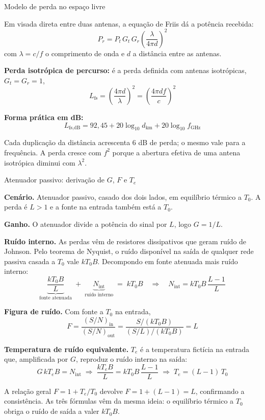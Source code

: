 \begin{frame}[allowframebreaks]{Modelo de perda no espaço livre}

Em visada direta entre duas antenas, a equação de Friis dá a potência recebida:
\[
P_r = P_t \, G_t \, G_r \left( \frac{\lambda}{4 \pi d} \right)^2
\]
com $\lambda = c/f$ o comprimento de onda e $d$ a distância entre as antenas.

\vspace{0.2cm}

\textbf{Perda isotrópica de percurso:} é a perda definida com antenas isotrópicas, $G_t = G_r = 1$,
\[
L_{\text{fs}} = \left( \frac{4 \pi d}{\lambda} \right)^2 = \left( \frac{4 \pi d f}{c} \right)^2
\]

\textbf{Forma prática em dB:}
\[
L_{\text{fs,dB}} = 92{,}45 + 20\log_{10} d_{\text{km}} + 20\log_{10} f_{\text{GHz}}
\]

\vspace{0.2cm}

Cada duplicação da distância acrescenta $6$ dB de perda; o mesmo vale para a frequência. A perda cresce com $f^2$ porque a abertura efetiva de uma antena isotrópica diminui com $\lambda^2$.

\end{frame}


\begin{frame}[allowframebreaks]{Atenuador passivo: derivação de $G$, $F$ e $T_e$}

\textbf{Cenário.} Atenuador passivo, casado dos dois lados, em equilíbrio térmico a $T_0$. A perda é $L > 1$ e a fonte na entrada também está a $T_0$.

\textbf{Ganho.} O atenuador divide a potência do sinal por $L$, logo $G = 1/L$.

\textbf{Ruído interno.} As perdas vêm de resistores dissipativos que geram ruído de Johnson. Pelo teorema de Nyquist, o ruído disponível na saída de qualquer rede passiva casada a $T_0$ vale $kT_0 B$. Decompondo em fonte atenuada mais ruído interno:
\[
\underbrace{\frac{kT_0 B}{L}}_{\text{fonte atenuada}} \;+\; \underbrace{N_{\text{int}}}_{\text{ruído interno}} \;=\; kT_0 B
\quad\Longrightarrow\quad
N_{\text{int}} = kT_0 B \, \frac{L-1}{L}
\]

\textbf{Figura de ruído.} Com fonte a $T_0$ na entrada,
\[
F = \frac{(S/N)_{\text{in}}}{(S/N)_{\text{out}}} = \frac{S/(kT_0 B)}{(S/L)/(kT_0 B)} = L
\]

\textbf{Temperatura de ruído equivalente.} $T_e$ é a temperatura fictícia na entrada que, amplificada por $G$, reproduz o ruído interno na saída:
\[
G \, k T_e B = N_{\text{int}}
\;\Longrightarrow\;
\frac{k T_e B}{L} = kT_0 B \, \frac{L-1}{L}
\;\Longrightarrow\;
T_e = (L-1)\, T_0
\]

A relação geral $F = 1 + T_e/T_0$ devolve $F = 1 + (L-1) = L$, confirmando a consistência. As três fórmulas vêm da mesma ideia: o equilíbrio térmico a $T_0$ obriga o ruído de saída a valer $kT_0 B$.

\end{frame}

